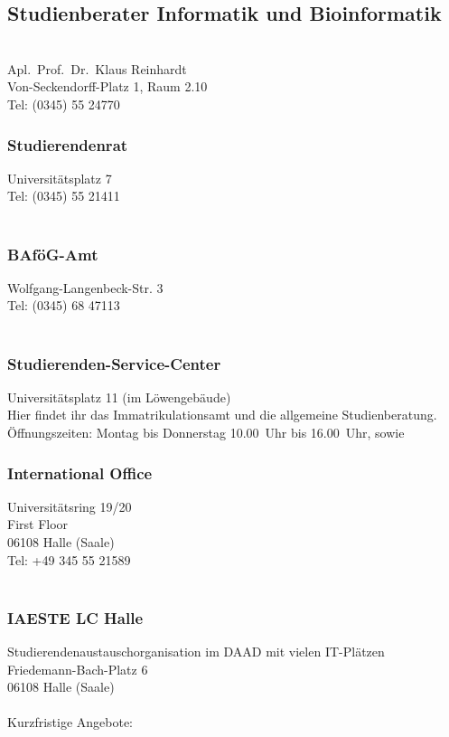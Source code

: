 \subsection{Studienberater Informatik und Bioinformatik}\\
Apl.\ Prof.\ Dr.\ Klaus Reinhardt\\
Von-Seckendorff-Platz 1, Raum 2.10\\
Tel: (0345) 55 24770\\

\subsubsection{Studierendenrat}
Universitätsplatz 7\\
Tel: (0345) 55 21411\\
 \\

\subsubsection{BAföG-Amt}
Wolfgang-Langenbeck-Str. 3\\
Tel: (0345) 68 47113\\
\\

\subsubsection{Studierenden-Service-Center}
Universitätsplatz 11 (im Löwengebäude)\\
Hier findet ihr das Immatrikulationsamt und die allgemeine
Studienberatung.\\
Öffnungszeiten: Montag bis Donnerstag 10.00~Uhr bis 16.00~Uhr, sowie \\

\subsubsection{International Office}
Universitätsring 19/20 \\
First Floor \\
06108 Halle (Saale) \\
Tel: +49 345 55 21589\\
\\

\subsubsection{IAESTE LC Halle}
Studierendenaustauschorganisation im DAAD mit vielen IT-Plätzen \\
Friedemann-Bach-Platz 6 \\
06108 Halle (Saale) \\
 \\
Kurzfristige Angebote: 

